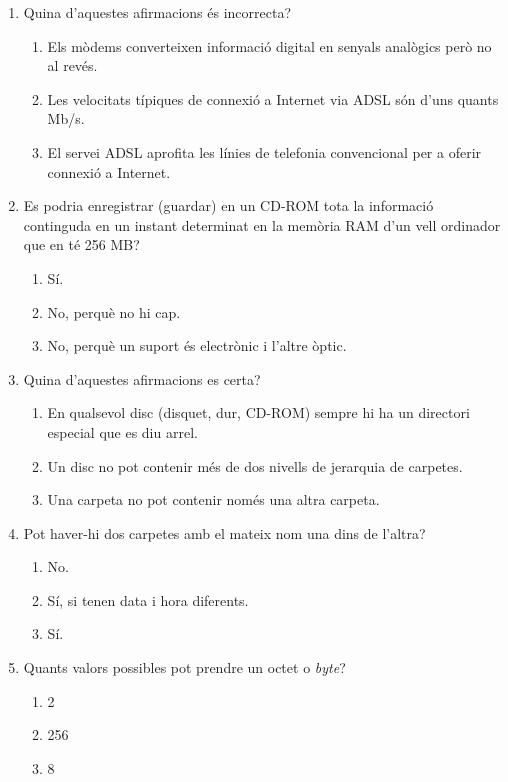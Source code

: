 \begin{enumerate}
\item Quina d'aquestes afirmacions és incorrecta?
      \begin{enumerate}
      \item Els mòdems converteixen informació digital en senyals
            analògics però no al revés.
          \item Les velocitats típiques de connexió a Internet via
            ADSL són d'uns quants Mb/s.
          \item El servei ADSL aprofita les línies de telefonia
            convencional per a oferir connexió a Internet.
      \end{enumerate}
      
    \item Es podria enregistrar (guardar) en un CD-ROM tota la
      informació continguda en un instant determinat en la memòria RAM
      d'un vell ordinador que en té 256 MB?
      \begin{enumerate} 
      \item Sí.
      \item No, perquè no hi cap.
      \item No, perquè un suport és electrònic i l'altre òptic.
      \end{enumerate}
\item Quina d'aquestes afirmacions es certa?
        \begin{enumerate}
        \item En qualsevol disc (disquet, dur, CD-ROM) sempre hi ha un directori especial que
          es diu arrel.
        \item Un disc no pot contenir més de dos nivells de jerarquia
              de carpetes.
        \item Una carpeta no pot contenir només una altra carpeta.
        \end{enumerate}

\item Pot haver-hi dos carpetes amb el mateix nom una dins de l'altra?
        \begin{enumerate}
        \item No.
        \item Sí, si tenen data i hora diferents.
        \item Sí.
        \end{enumerate}


\item Quants valors possibles pot prendre un octet o \emph{byte}?
 \begin{enumerate}
 \item 2
 \item 256
 \item 8
 \end{enumerate}


\end{enumerate}
